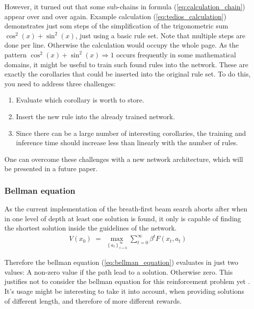 \documentclass{scrartcl}
\theoremstyle{definition}
\begin{document}
However, it turned out that some sub-chains in formula (\ref{eq:calculation_chain}) appear over and over again.
Example calculation (\ref{eq:tedios_calculation}) demonstrates just som steps of the simplification of the trigonometric sum $\cos^2(x)+\sin^2(x)$, just using a basic rule set.
Note that multiple steps are done per line. Otherwise the calculation would occupy the whole page.
As the pattern $\cos^2(x)+\sin^2(x) \Longrightarrow 1$ occurs frequently in some mathematical domains, it might be useful to train such found rules into the network.   
These are exactly the corollaries that could be inserted into the original rule set.
To do this, you need to address three challenges:

\begin{enumerate}[label=(\roman*)]
	\item Evaluate which corollary is worth to store.
	\item Insert the new rule into the already trained network.
	\item Since there can be a large number of interesting corollaries, the training and inference time should increase less than linearly with the number of rules.
\end{enumerate}

One can overcome these challenges with a new network architecture, which will be presented in a future paper.

\subsubsection{Bellman equation}

As the current implementation of the breath-first beam search aborts after when in one level of depth at least one solution is found,
it only is capable of finding the shortest solution inside the guidelines of the network.
\begin{align}
	V(x_{0})\;=\;\max _{\left\{a_{t}\right\}_{t=0}^{\infty }}\sum _{t=0}^{\infty }\beta ^{t}F(x_{t},a_{t})
	\label{eq:bellman_equation}
\end{align}

Therefore the bellman equation (\ref{eq:bellman_equation}) evaluates in just two values: A non-zero value if the path lead to a solution. Otherwise zero.
This justifies not to consider the bellman equation for this reinforcement problem yet \cite{bellman}.
It's usage might be interesting to take it into account, when providing solutions of different length, and therefore of more different rewards.
\end{document}
